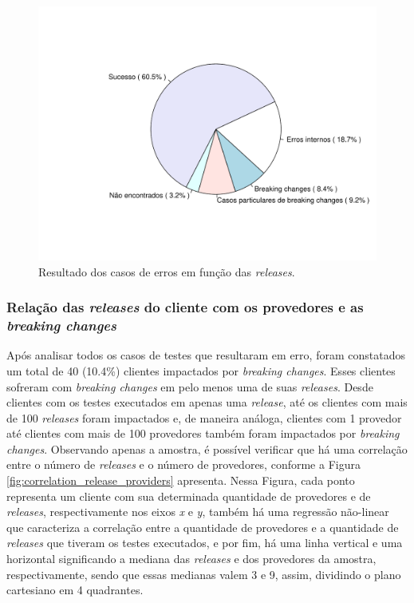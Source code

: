 \begin{figure}
    \centering
    \includegraphics[scale=0.8]{figuras/pre_res_rq1.pdf}
    \caption{Resultado dos casos de erros em função das \textit{releases}.}
    \label{fig:pre_res_rq1}
\end{figure}{}

\subsubsection{Relação das \textit{releases} do cliente com os provedores e as \textit{breaking changes}}

Após analisar todos os casos de testes que resultaram em erro, foram constatados um total de 40 (10.4\%) clientes impactados por \textit{breaking changes}. Esses clientes sofreram com \textit{breaking changes} em pelo menos uma de suas \textit{releases}. Desde clientes com os testes executados em apenas uma \textit{release}, até os clientes com mais de 100 \textit{releases} foram impactados e, de maneira análoga, clientes com 1 provedor até clientes com mais de 100 provedores também foram impactados por \textit{breaking changes}. Observando apenas a amostra, é possível verificar que há uma correlação entre o número de \textit{releases} e o número de provedores, conforme a Figura \ref{fig:correlation_release_providers} apresenta. Nessa Figura, cada ponto representa um cliente com sua determinada quantidade de provedores e de \textit{releases}, respectivamente nos eixos \textit{x} e \textit{y}, também há uma regressão não-linear que caracteriza a correlação entre a quantidade de provedores e a quantidade de \textit{releases} que tiveram os testes executados, e por fim, há uma linha vertical e uma horizontal significando a mediana das \textit{releases} e dos provedores da amostra, respectivamente, sendo que essas medianas valem 3 e 9, assim, dividindo o plano cartesiano em 4 quadrantes. 

